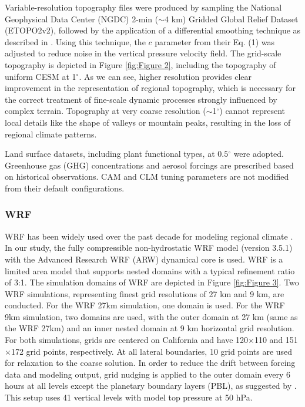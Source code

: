\documentclass[draft,ms]{agutex}   %
\begin{document}
\begin{article}
Variable-resolution topography files were produced by sampling the National Geophysical Data Center (NGDC) 2-min ($\sim$4 km) Gridded Global Relief Dataset (ETOPO2v2), followed by the application of a differential smoothing technique as described in \cite{zarzycki2015effects}.  Using this technique, the $c$ parameter from their Eq. (1) was adjusted to reduce noise in the vertical pressure velocity field. The grid-scale topography is depicted in Figure \ref{fig:Figure 2}, including the topography of uniform CESM at 1$^\circ$. As we can see, higher resolution provides clear improvement in the representation of regional topography, which is necessary for the correct treatment of fine-scale dynamic processes strongly influenced by complex terrain. Topography at very coarse resolution ($\sim$1$^\circ$) cannot represent local details like the shape of valleys or mountain peaks, resulting in the loss of regional climate patterns.

Land surface datasets, including plant functional types, at $0.5$$^\circ$ were adopted. Greenhouse gas (GHG) concentrations and aerosol forcings are prescribed based on historical observations. CAM and CLM tuning parameters are not modified from their default configurations.


\subsubsection{WRF} 

WRF has been widely used over the past decade for modeling regional climate \citep{lo2008assessment, leung2009atmospheric, soares2012wrf, sun2015hybrid}. In our study, the fully compressible non-hydrostatic WRF model (version 3.5.1) with the Advanced Research WRF (ARW) dynamical core is used.  WRF is a limited area model that supports nested domains with a typical refinement ratio of 3:1.  The simulation domains of WRF are depicted in Figure \ref{fig:Figure 3}. Two WRF simulations, representing finest grid resolutions of 27 km and 9 km, are conducted.  For the WRF 27km simulation, one domain is used. For the WRF 9km simulation, two domains are used, with the outer domain at 27 km (same as the WRF 27km) and an inner nested domain at 9 km horizontal grid resolution. For both simulations,  grids are centered on California and have 120$\times$110 and 151$\times$172 grid points, respectively. At all lateral boundaries, 10 grid points are used for relaxation to the coarse solution. In order to reduce the drift between forcing data and modeling output, grid nudging \citep{stauffer1990use} is applied to the outer domain every 6 hours at all levels except the planetary boundary layers (PBL), as suggested by \cite{lo2008assessment}. This setup uses 41 vertical levels with model top pressure at 50 hPa.


\end{article}
\end{document}
